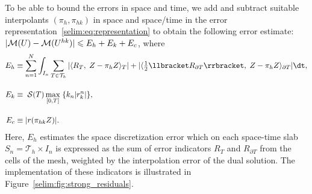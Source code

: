 To be able to bound the errors in space and time, we
add and subtract suitable interpolants $(\pi_h, \pi_{hk})$ in space
and space/time in the error
representation~\eqref{selim:eq:representation} to obtain the following
\apost{} error estimate: $|\mathcal{M}(U) - \mathcal{M}(U^{hk})| \leqslant  E_h +
E_k + E_c$, where
\begin{align}
  \label{selim:eq:aposteriori-Eh}
   E_h &\equiv \sum_{n=1}^{N}\int_{I_n} \sum_{T\in\mathcal{T}_h}| \langle
   R_T,\; Z - \pi_h Z \rangle_T |+ | \langle \tfrac{1}{2}\llbracket R_{\partial T}
   \rrbracket,\; Z - \pi_h Z \rangle _{\partial T}|\dt,
   \\\nonumber\\[-4pt]
   \label{selim:eq:aposteriori-Ek}
   E_k &\equiv\;\mathcal{S}(T)\max_{[0,T]}\;\{k_n | r_k ^n|\},
   \\\nonumber\\[-4pt]
   \label{selim:eq:aposteriori-Ec}
   E_c &\equiv |r(\pi_{hk}Z)|.
\end{align}
Here, $E_h$ estimates the space discretization error which on each
space-time slab $S_n = \mathcal{T}_h \times I_n$ is expressed as the sum
of error indicators $R_T$ and $R_{\partial T}$ from the cells of the
mesh, weighted by the interpolation error of the dual solution. The
implementation of these indicators is illustrated in Figure~\ref{selim:fig:strong_residuals}.

